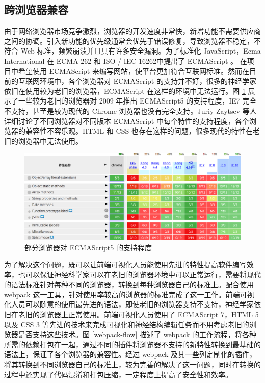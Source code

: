 \subsection{跨浏览器兼容}
由于网络浏览器市场竞争激烈，浏览器的开发速度非常快，新增功能不需要供应商之间的协调。引入新功能的优先级通常会优先于错误修复，导致浏览器不稳定，不符合 Web 标准，频繁崩溃并且具有许多安全漏洞。为了标准化 JavaScript，Ecma International 在 ECMA-262 和 ISO / IEC 16262中提出了 ECMAScript 。 在项目中希望使用 ECMAScript 来编写网站，使平台更加符合互联网标准。然而在目前的互联网环境中，各个浏览器对 ECMAScript 的支持并不好，很多的神经学家依旧在使用较为老旧的浏览器，ECMAScript 在这样的环境中无法运行。图 \ref{es5} 展示了一些较为老旧的浏览器对 2009 年推出 ECMAScript5 的支持程度，IE7 完全不支持，甚至是较为现代的 Chrome 浏览器也没有完全支持。Juriy Zaytsev 等人详细讨论了不同浏览器对不同版本 ECMAScript 中每个特性的支持程度，各个浏览器的兼容性不容乐观。HTML 和 CSS 也存在这样的问题，很多现代的特性在老旧的浏览器中无法使用。

\begin{figure}[!ht]
\centering
\includegraphics[width=148mm]{images/es5}
\caption{部分浏览器对 ECMAScript5 的支持程度}
\label{es5}
\end{figure}

为了解决这个问题，既可以让前端可视化人员能使用先进的特性提高软件编写效率，也可以保证神经科学家可以在老旧的浏览器环境中可以正常运行，需要将现代的语法标准针对每种不同的浏览器，转换到每种浏览器自己的标准上。配合使用 webpack 这一工具，针对使用率较高的浏览器的标准完成了这一工作。前端可视化人员可以随意的使用最先进的语法，即使老旧的浏览器支持不支持，神经学家依旧在老旧的浏览器上正常使用。前端可视化人员使用了 ECMAScript 7，HTML 5 以及 CSS 3 等先进的技术来完成可视化和神经结构编辑任务而不用考虑老旧的浏览器是否支持这些技术。图 \ref{webpack-flow} 描述了 webpack 的工作流程，将各种所需的依赖打包在一起，通过不同的插件将浏览器不支持的新特性转换到最基础的语法上，保证了各个浏览器的兼容性。经过 webpack 及其一些列定制化的插件，将其转换到不同浏览器自己的标准上，较为完善的解决了这一问题，同时在转换的过程中还实现了代码混淆和打包压缩，一定程度上提高了安全性和效率。

